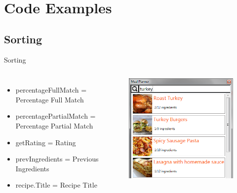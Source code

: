 \section{Code Examples}

\subsection{Sorting}
\begin{frame}{Sorting}
    \begin{columns}
        \begin{itemize}
            \item percentageFullMatch = Percentage Full Match
            \item percentagePartialMatch = Percentage Partial Match
            \item getRating = Rating
            \item prevIngredients = Previous Ingredients
            \item recipe.Title = Recipe Title
        \end{itemize}
        \begin{figure}
            \centering
            \includegraphics[width=\textwidth]{graphics/recipe-search-item}
        \end{figure}
    \end{columns}

\end{frame}

